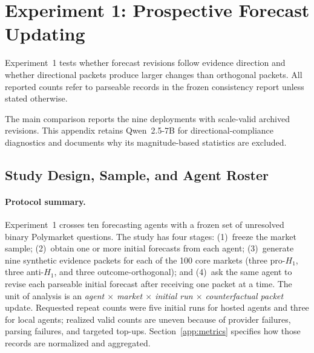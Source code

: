 
\section{Experiment 1: Prospective Forecast Updating}
\label{app:exp1}

Experiment~1 tests whether
forecast revisions follow evidence direction and whether directional packets
produce larger changes than orthogonal packets.
All reported counts refer to parseable records in the frozen consistency report
unless stated otherwise.

The main comparison reports the nine deployments with scale-valid archived
revisions. This appendix retains Qwen~2.5-7B for directional-compliance diagnostics
and documents why its magnitude-based statistics are excluded.

\subsection{Study Design, Sample, and Agent Roster}
\label{app:exp1-sample}

\paragraph{Protocol summary.}
Experiment~1 crosses ten forecasting agents with a frozen set of unresolved binary
Polymarket questions.  The study has four stages: (1)~freeze the market sample;
(2)~obtain one or more initial forecasts from each agent; (3)~generate nine synthetic
evidence packets for each of the 100 core markets (three pro-$H_1$, three
anti-$H_1$, and three outcome-orthogonal); and (4)~ask the same agent to revise each
parseable initial forecast after receiving one packet at a time.  The unit of analysis is an \emph{agent $\times$ market $\times$ initial run
$\times$ counterfactual packet} update.  Requested repeat
counts were five initial runs for hosted agents and three for local agents; realized
valid counts are uneven because of provider failures, parsing failures, and targeted
top-ups.  Section~\ref{app:metrics} specifies how those records are normalized and
aggregated.

